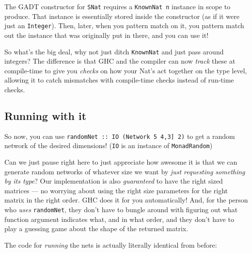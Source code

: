 \documentclass[]{article}
\begin{document}
The GADT constructor for \texttt{SNat} requires a \texttt{KnownNat\ n} instance
in scope to produce. That instance is essentially stored inside the constructor
(as if it were just an \texttt{Integer}). Then, later, when you pattern match on
it, you pattern match out the instance that was originally put in there, and you
can use it!

So what's the big deal, why not just ditch \texttt{KnownNat} and just pass
around integers? The difference is that GHC and the compiler can now
\emph{track} these at compile-time to give you \emph{checks} on how your Nat's
act together on the type level, allowing it to catch mismatches with
compile-time checks instead of run-time checks.

\subsection{Running with it}\label{running-with-it}

So now, you can use
\texttt{randomNet\ ::\ IO\ (Network\ 5\ \textquotesingle{}{[}4,3{]}\ 2)} to get
a random network of the desired dimensions! (\texttt{IO} is an instance of
\texttt{MonadRandom})

Can we just pause right here to just appreciate how awesome it is that we can
generate random networks of whatever size we want by \emph{just requesting
something by its type}? Our implementation is also \emph{guaranteed} to have the
right sized matrices --- no worrying about using the right size parameters for
the right matrix in the right order. GHC does it for you automatically! And, for
the person who \emph{uses} \texttt{randomNet}, they don't have to bungle around
with figuring out what function argument indicates what, and in what order, and
they don't have to play a guessing game about the shape of the returned matrix.

The code for \emph{running} the nets is actually literally identical from
before:
\end{document}
